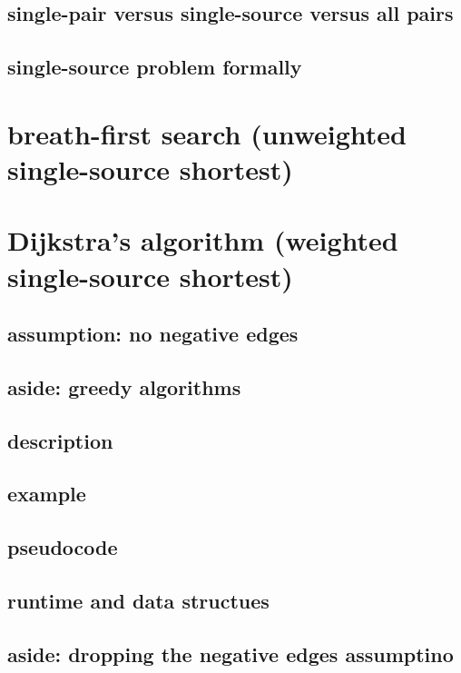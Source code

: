 \subsection{single-pair versus single-source versus all pairs}

\subsection{single-source problem formally}

\section{breath-first search (unweighted single-source shortest)}

\section{Dijkstra's algorithm (weighted single-source shortest)}

\subsection{assumption: no negative edges}

\subsection{aside: greedy algorithms}

\subsection{description}

\subsection{example}

\subsection{pseudocode}

\subsection{runtime and data structues}

\subsection{aside: dropping the negative edges assumptino}

